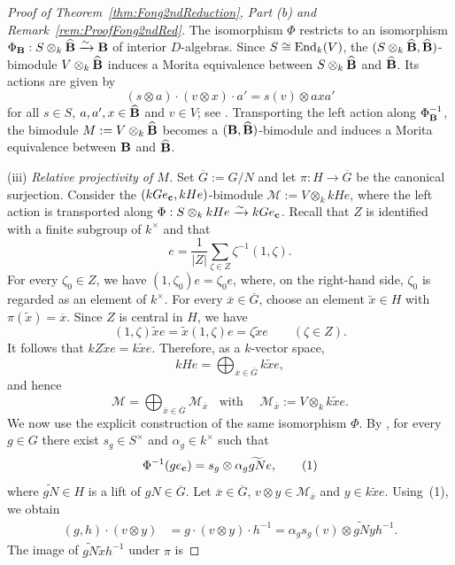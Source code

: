 \begin{proof}[Proof of Theorem~\ref{thm:Fong2ndReduction}, Part {\rm(b)} and
Remark~\ref{rem:ProofFong2ndRed}]{\leavevmode}
The isomorphism $\Phi$ restricts to an isomorphism $\Phi_{{\mathbf{B}}}:S\otimes_k\widehat{{\mathbf{B}}}\xrightarrow{\sim}{\mathbf{B}}$ of interior $D$-algebras. Since $S\cong\operatorname{End}_k(V)$, the $(S\otimes_k\widehat{{\mathbf{B}}},\widehat{{\mathbf{B}}})$-bimodule $V\otimes_k\widehat{{\mathbf{B}}}$ induces a Morita equivalence between
$S\otimes_k\widehat{{\mathbf{B}}}$ and $\widehat{{\mathbf{B}}}$. Its actions are given by
\[
(s\otimes a)\cdot(v\otimes x)\cdot a'=s(v)\otimes axa'
\]
for all $s\in S$, $a,a',x\in\widehat{{\mathbf{B}}}$ and $v\in V$; see \cite[Exercise~9.5(a)]{ThevenazBook}. Transporting the left action along $\Phi_{{\mathbf{B}}}^{-1}$, the bimodule $M:=V\otimes_k\widehat{{\mathbf{B}}}$ becomes a $({\mathbf{B}},\widehat{{\mathbf{B}}})$-bimodule and induces a Morita equivalence between ${\mathbf{B}}$ and $\widehat{{\mathbf{B}}}$.

\smallskip
\noindent
{\rm(iii)} \emph{Relative projectivity of $M$.}
Set $\overline G:=G/N$
and let $\pi:H\to\overline G$
be the canonical surjection. Consider the $(kGe_{{\mathbf{c}}},kHe)$-bimodule $\mathcal M:=V\otimes_k kHe$, where the left action is transported along $\Phi:S\otimes_k kHe\xrightarrow{\sim}kGe_{{\mathbf{c}}}$. 
Recall that $Z$ is identified with a finite subgroup of $k^\times$ and that
\[
e=\frac{1}{|Z|}
\sum_{\zeta\in Z}\zeta^{-1}(1,\zeta).
\]
For every $\zeta_0\in Z$, we have $(1,\zeta_0)e=\zeta_0e$, where, on the right-hand side, $\zeta_0$ is regarded as an element of $k^\times$. For every $\overline x\in\overline G$, choose an element $\widetilde x\in H$ with $\pi(\widetilde x)=\overline x$. Since $Z$ is central in $H$, we have
\[
(1,\zeta)\widetilde xe=\widetilde x(1,\zeta)e=\zeta\widetilde xe \qquad(\zeta\in Z).
\]
It follows that $kZ\widetilde xe=k\widetilde xe$. Therefore, as a $k$-vector space,
\[
kHe=\bigoplus_{\overline x\in\overline G} k\widetilde xe,
\]
and hence
\[
\mathcal M=\bigoplus_{\overline x\in\overline G}
\mathcal M_{\overline x}\;\;\text{ with }\quad\mathcal M_{\overline x}:=V\otimes_k k\widetilde xe.
\]
We now use the explicit construction of the same
isomorphism $\Phi$. By \cite[Section~3]{SalminenSOURCES08}, for every $g\in G$
there exist $s_g\in S^\times$ and $\alpha_g\in k^\times$ such that
\[
\Phi^{-1}(ge_{{\mathbf{c}}})=s_g\otimes \alpha_g\widetilde{gN}e,
\tag{1}
\]
where $\widetilde{gN}\in H$ is a lift of
$gN\in\overline G$. 
Let $\overline x\in\overline G$, $v\otimes y\in\mathcal M_{\overline x}$ and $y\in k\widetilde xe$. Using~{\rm(1)}, we obtain
\begin{align*}
(g,h)\cdot(v\otimes y)&=g\cdot(v\otimes y)\cdot h^{-1}=\alpha_gs_g(v)\otimes \widetilde{gN}yh^{-1}.
\end{align*}
The image of
$\widetilde{gN}\widetilde xh^{-1}$ under $\pi$ is

\end{proof}
